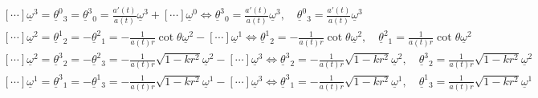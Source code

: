 \documentclass[10pt, a4paper]{article}
\begin{document}
{\begin{enumerate}
\begin{align*}
    &[\cdots] \underline{\omega}^3 = \underline{\theta}^0{ }_{3} = \underline{\theta}^3{ }_{0} = \frac{a'(t)}{a(t)}\underline{\omega}^3 + [\cdots] \underline{\omega}^0 \iff \underline{\theta}^3{ }_{0} = \frac{a'(t)}{a(t)}\underline{\omega}^3, \quad \underline{\theta}^0{ }_{3} = \frac{a'(t)}{a(t)}\underline{\omega}^3\\
    &[\cdots] \underline{\omega}^2 = \underline{\theta}^1{ }_{2} = -\underline{\theta}^2{ }_{1} = -\frac{1}{a(t)r}\cot \theta \underline{\omega}^2 - [\cdots]\underline{\omega}^1 \iff \underline{\theta}^1{ }_{2} = -\frac{1}{a(t)r}\cot \theta \underline{\omega}^2, \quad \underline{\theta}^2{ }_{1} = \frac{1}{a(t)r}\cot \theta \underline{\omega}^2\\
    &[\cdots] \underline{\omega}^2 = \underline{\theta}^3{ }_{2} = -\underline{\theta}^2{ }_{3} = -\frac{1}{a(t)r}\sqrt{1-k r^2}\underline{\omega}^2 - [\cdots]\underline{\omega}^3 \iff \underline{\theta}^3{ }_{2} = -\frac{1}{a(t)r}\sqrt{1-k r^2}\underline{\omega}^2, \quad \underline{\theta}^3{ }_{2} = \frac{1}{a(t)r}\sqrt{1-k r^2}\underline{\omega}^2\\
    &[\cdots] \underline{\omega}^1 = \underline{\theta}^3{ }_{1} = -\underline{\theta}^1{ }_{3} = -\frac{1}{a(t)r}\sqrt{1-k r^2}\underline{\omega}^1 - [\cdots]\underline{\omega}^3 \iff \underline{\theta}^3{ }_{1} = -\frac{1}{a(t)r}\sqrt{1-k r^2}\underline{\omega}^1, \quad \underline{\theta}^1{ }_{3} = \frac{1}{a(t)r}\sqrt{1-k r^2}\underline{\omega}^1
  \end{align*}
  

\end{enumerate}}
\end{document}
